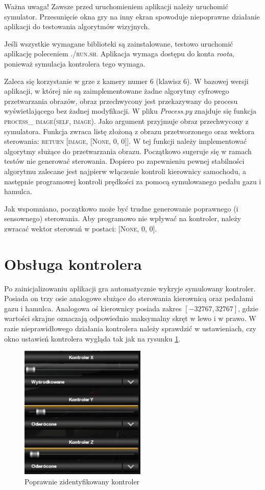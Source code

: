 Ważna uwaga! 
Zawsze przed uruchomieniem aplikacji należy uruchomić symulator. 
Przesunięcie okna gry na inny ekran spowoduje niepoprawne działanie aplikacji do testowania algorytmów wizyjnych.

Jeśli wszystkie wymagane biblioteki są zainstalowane, testowo uruchomić aplikację poleceniem \textsc{./run.sh}. 
Aplikacja wymaga dostępu do konta \textit{roota}, ponieważ symulacja kontrolera tego wymaga. %

Zaleca się korzystanie w grze z kamery numer 6 (klawisz 6).
W bazowej wersji aplikacji, w której nie są zaimplementowane żadne algorytmy cyfrowego przetwarzania obrazów, obraz przechwycony jest przekazywany do procesu wyświetlającego bez żadnej modyfikacji. %
W pliku \textit{Process.py} znajduje się funkcja \textsc{process\_ image(self, image)}. 
Jako argument przyjmuje obraz przechwycony z symulatora. 
Funkcja zwraca listę złożoną z obrazu przetworzonego oraz wektora sterowania: \textsc{return [image, [None, 0, 0]]}. 
W tej funkcji należy implementować algorytmy służące do przetwarzania obrazu. 
Początkowo sugeruje się w ramach testów nie generować sterowania. 
Dopiero po zapewnieniu pewnej stabilności algorytmu zalecane jest najpierw włączenie kontroli kierownicy samochodu, a następnie programowej kontroli prędkości za pomocą symulowanego pedału gazu i hamulca.

Jak wspomniano, początkowo może być trudne generowanie poprawnego (i sensownego) sterowania. 
Aby programowo nie wpływać na kontroler, należy zwracać wektor sterowań w postaci: \textsc{[None, 0, 0]}.

\section{Obsługa kontrolera}

Po zainicjalizowaniu aplikacji gra automatycznie wykryje symulowany kontroler. 
Posiada on trzy osie analogowe służące do sterowania kierownicą oraz pedałami gazu i hamulca. 
Analogowa oś kierownicy posiada zakres $[-32767, 32767]$, gdzie wartości skrajne oznaczają odpowiednio maksymalny skręt w lewo i w prawo. 
W razie nieprawidłowego działania kontrolera należy sprawdzić w ustawieniach, czy okno ustawień kontrolera wygląda tak jak na rysunku \ref{fig:appendix1_controller}. %

\begin{figure}
  \centering
  \includegraphics[width=6cm]{img/appendix1_controller.png}
  \caption{Poprawnie zidentyfikowany kontroler}
  \label{fig:appendix1_controller}
\end{figure}

